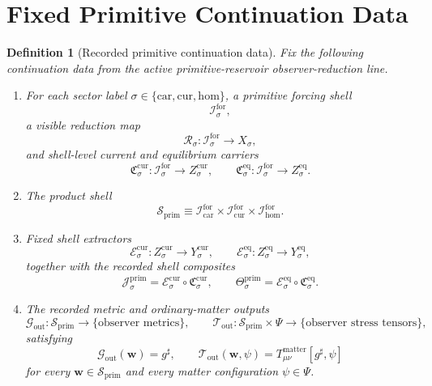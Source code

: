 \documentclass[11pt]{article}
\newcommand{\CompletedMetric}{g^{\sharp}}
\newcommand{\Car}{\mathrm{car}}
\newcommand{\Cur}{\mathrm{cur}}
\newcommand{\Hom}{\mathrm{hom}}
\newcommand{\ForSpace}[1]{\mathcal I_{#1}^{\mathrm{for}}}
\newcommand{\PrimShell}{\mathcal S_{\mathrm{prim}}}
\newcommand{\Reduction}[1]{\mathcal R_{#1}}
\newcommand{\CurrentCarrier}[1]{\mathfrak C_{#1}^{\mathrm{cur}}}
\newcommand{\EqCarrier}[1]{\mathfrak C_{#1}^{\mathrm{eq}}}
\newcommand{\CurrentExtract}[1]{\mathscr E_{#1}^{\mathrm{cur}}}
\newcommand{\EqExtract}[1]{\mathscr E_{#1}^{\mathrm{eq}}}
\newcommand{\PrimCurrent}[1]{\mathcal J_{#1}^{\mathrm{prim}}}
\newcommand{\PrimTheta}[1]{\Theta_{#1}^{\mathrm{prim}}}
\newcommand{\MetricOut}{\mathscr G_{\mathrm{out}}}
\newcommand{\MatterOut}{\mathscr T_{\mathrm{out}}}
\newtheorem{definition}{Definition}
\begin{document}
\section{Fixed Primitive Continuation Data}

\begin{definition}[Recorded primitive continuation data]
\label{def:fixed}
Fix the following continuation data from the active primitive-reservoir observer-reduction line.
\begin{enumerate}
    \item For each sector label \(\sigma\in\{\Car,\Cur,\Hom\}\), a primitive forcing shell
    \[
    \ForSpace{\sigma},
    \]
    a visible reduction map
    \[
    \Reduction{\sigma}:\ForSpace{\sigma}\to X_{\sigma},
    \]
    and shell-level current and equilibrium carriers
    \[
    \CurrentCarrier{\sigma}:\ForSpace{\sigma}\to Z_{\sigma}^{\mathrm{cur}},
    \qquad
    \EqCarrier{\sigma}:\ForSpace{\sigma}\to Z_{\sigma}^{\mathrm{eq}}.
    \]
    \item The product shell
    \[
    \PrimShell
    \equiv
    \ForSpace{\Car}\times \ForSpace{\Cur}\times \ForSpace{\Hom}.
    \]
    \item Fixed shell extractors
    \[
    \CurrentExtract{\sigma}:Z_{\sigma}^{\mathrm{cur}}\to Y_{\sigma}^{\mathrm{cur}},
    \qquad
    \EqExtract{\sigma}:Z_{\sigma}^{\mathrm{eq}}\to Y_{\sigma}^{\mathrm{eq}},
    \]
    together with the recorded shell composites
    \begin{equation}
    \PrimCurrent{\sigma}
    =
    \CurrentExtract{\sigma}\circ \CurrentCarrier{\sigma},
    \qquad
    \PrimTheta{\sigma}
    =
    \EqExtract{\sigma}\circ \EqCarrier{\sigma}.
    \label{eq:primcomposites}
    \end{equation}
    \item The recorded metric and ordinary-matter outputs
    \[
    \MetricOut:\PrimShell\to\{\text{observer metrics}\},
    \qquad
    \MatterOut:\PrimShell\times\Psi\to\{\text{observer stress tensors}\},
    \]
    satisfying
    \begin{equation}
    \MetricOut(\mathbf w)=\CompletedMetric,
    \qquad
    \MatterOut(\mathbf w,\psi)
    =
    T_{\mu\nu}^{\mathrm{matter}}[\CompletedMetric,\psi]
    \label{eq:fixedoutputs}
    \end{equation}
    for every \(\mathbf w\in\PrimShell\) and every matter configuration \(\psi\in\Psi\).
\end{enumerate}
\end{definition}
\end{document}
